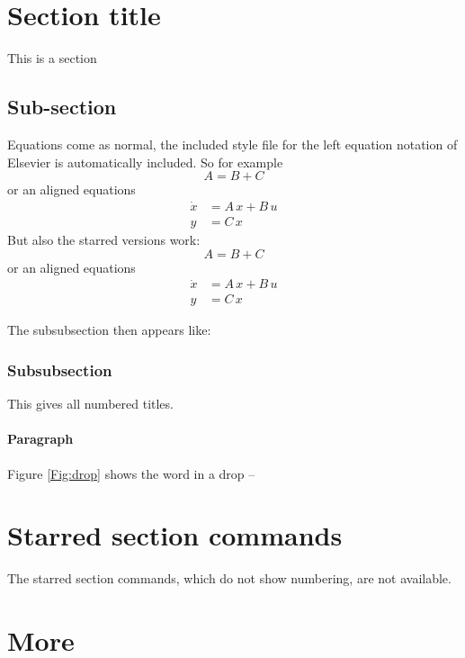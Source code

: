 \documentclass[fleqn,twoside,10pt]{article}
\begin{document}

\section{Section title}

This is a section

\subsection{Sub-section}

Equations come as normal, the included style file for the left equation notation of Elsevier is automatically included. So for example
\begin{equation}
  A = B + C
\end{equation}
or an aligned equations
\begin{align}
  \dot{x} &= A \, x + B \, u \\
  y &= C \, x
\end{align}
But also the starred versions work:
\begin{equation*}
  A = B + C
\end{equation*}
or an aligned equations
\begin{align*}
  \dot{x} &= A \, x + B \, u \\
  y &= C \, x
\end{align*}


The subsubsection then appears like:

\subsubsection{Subsubsection}
This gives all numbered titles. \cite{Reference2015}
\paragraph{Paragraph}
Figure \ref{Fig:drop} shows the word in a drop -- 

\section{Starred section commands}
The starred section commands, which do not show numbering, are not available.

\section{More}



{\small\bibsep=0pt

}
\end{document}
